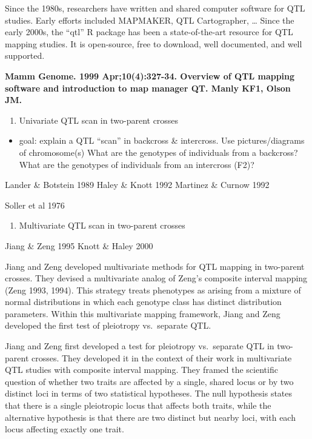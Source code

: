 \documentclass[]{article}
\providecommand{\tightlist}{%
  \setlength{\itemsep}{0pt}\setlength{\parskip}{0pt}}
\begin{document}
Since the 1980s, researchers have written and shared computer software
for QTL studies. Early efforts included MAPMAKER, QTL Cartographer,
\ldots{} Since the early 2000s, the ``qtl'' R package has been a
state-of-the-art resource for QTL mapping studies. It is open-source,
free to download, well documented, and well supported.

\textbf{Mamm Genome. 1999 Apr;10(4):327-34. Overview of QTL mapping
software and introduction to map manager QT. Manly KF1, Olson JM.}

\begin{enumerate}
\def\labelenumi{\arabic{enumi}.}
\setcounter{enumi}{1}
\tightlist
\item
  Univariate QTL scan in two-parent crosses
\end{enumerate}

\begin{itemize}
\tightlist
\item
  goal: explain a QTL ``scan'' in backcross \& intercross. Use
  pictures/diagrams of chromosome(s) What are the genotypes of
  individuals from a backcross? What are the genotypes of individuals
  from an intercross (F2)?
\end{itemize}

Lander \& Botstein 1989 Haley \& Knott 1992 Martinez \& Curnow 1992

Soller et al 1976

\begin{enumerate}
\def\labelenumi{\arabic{enumi}.}
\setcounter{enumi}{2}
\tightlist
\item
  Multivariate QTL scan in two-parent crosses
\end{enumerate}

Jiang \& Zeng 1995 Knott \& Haley 2000

Jiang and Zeng developed multivariate methods for QTL mapping in
two-parent crosses. They devised a multivariate analog of Zeng's
composite interval mapping (Zeng 1993, 1994). This strategy treats
phenotypes as arising from a mixture of normal distributions in which
each genotype class has distinct distribution parameters. Within this
multivariate mapping framework, Jiang and Zeng developed the first test
of pleiotropy vs.~separate QTL.

Jiang and Zeng first developed a test for pleiotropy vs.~separate QTL in
two-parent crosses. They developed it in the context of their work in
multivariate QTL studies with composite interval mapping. They framed
the scientific question of whether two traits are affected by a single,
shared locus or by two distinct loci in terms of two statistical
hypotheses. The null hypothesis states that there is a single
pleiotropic locus that affects both traits, while the alternative
hypothesis is that there are two distinct but nearby loci, with each
locus affecting exactly one trait.
\end{document}
